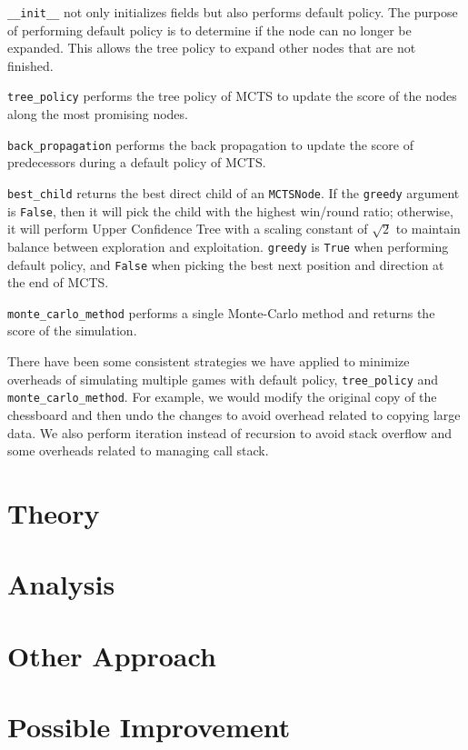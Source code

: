 \documentclass[twoside,11pt]{article}
\begin{document}
\texttt{\_\_init\_\_} not only initializes fields but also performs default policy.
The purpose of performing default policy is to determine if the node can no longer be expanded.
This allows the tree policy to expand other nodes that are not finished.

\texttt{tree\_policy} performs the tree policy of MCTS to update the score of the nodes along the most promising nodes.

\texttt{back\_propagation} performs the back propagation to update the score of predecessors during a default policy of MCTS.

\texttt{best\_child} returns the best direct child of an \texttt{MCTSNode}.
If the \texttt{greedy} argument is \texttt{False}, then it will pick the child with the highest win/round ratio;
otherwise, it will perform Upper Confidence Tree with a scaling constant of \(\sqrt{2}\) to maintain balance between exploration and exploitation.
\texttt{greedy} is \texttt{True} when performing default policy, and \texttt{False} when picking the best next position and direction at the end of MCTS.

\texttt{monte\_carlo\_method} performs a single Monte-Carlo method and returns the score of the simulation.

There have been some consistent strategies we have applied to minimize overheads of simulating multiple games with default policy, \texttt{tree\_policy} and \texttt{monte\_carlo\_method}. For example, we would modify the original copy of the chessboard and then undo the changes to avoid overhead related to copying large data. We also perform iteration instead of recursion to avoid stack overflow and some overheads related to managing call stack.

\section{Theory}

\section{Analysis}

\section{Other Approach}

\section{Possible Improvement}
\end{document}
